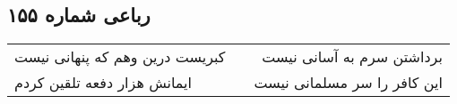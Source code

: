 \begin{center}
\section*{رباعی شماره ۱۵۵}
\label{sec:sh155}
\begin{longtable}{l p{0.5cm} r}
کبریست درین وهم که پنهانی نیست
&&
برداشتن سرم به آسانی نیست
\\
ایمانش هزار دفعه تلقین کردم
&&
این کافر را سر مسلمانی نیست
\\
\end{longtable}
\end{center}
